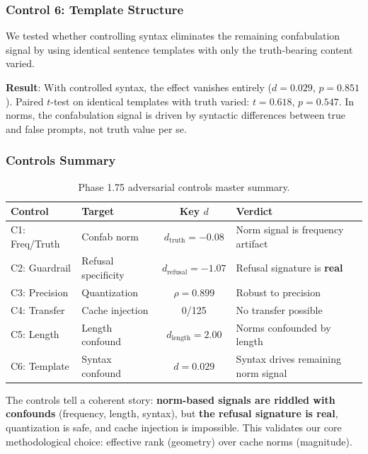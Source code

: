 \documentclass[11pt,a4paper]{article}
\begin{document}
\subsubsection{Control 6: Template Structure}

We tested whether controlling syntax eliminates the remaining confabulation signal by using identical sentence templates with only the truth-bearing content varied.

\textbf{Result}: With controlled syntax, the effect vanishes entirely ($d = 0.029$, $p = 0.851$). Paired $t$-test on identical templates with truth varied: $t = 0.618$, $p = 0.547$. In norms, the confabulation signal is driven by syntactic differences between true and false prompts, not truth value per se.

\subsubsection{Controls Summary}

\begin{table}[H]
\centering
\caption{Phase 1.75 adversarial controls master summary.}
\label{tab:controls_summary}
\begin{tabular}{llcl}
\toprule
\textbf{Control} & \textbf{Target} & \textbf{Key $d$} & \textbf{Verdict} \\
\midrule
C1: Freq/Truth & Confab norm & $d_{\text{truth}} = -0.08$ & Norm signal is frequency artifact \\
C2: Guardrail & Refusal specificity & $d_{\text{refusal}} = -1.07$ & Refusal signature is \textbf{real} \\
C3: Precision & Quantization & $\rho = 0.899$ & Robust to precision \\
C4: Transfer & Cache injection & 0/125 & No transfer possible \\
C5: Length & Length confound & $d_{\text{length}} = 2.00$ & Norms confounded by length \\
C6: Template & Syntax confound & $d = 0.029$ & Syntax drives remaining norm signal \\
\bottomrule
\end{tabular}
\end{table}

The controls tell a coherent story: \textbf{norm-based signals are riddled with confounds} (frequency, length, syntax), but \textbf{the refusal signature is real}, quantization is safe, and cache injection is impossible. This validates our core methodological choice: effective rank (geometry) over cache norms (magnitude).
\end{document}

